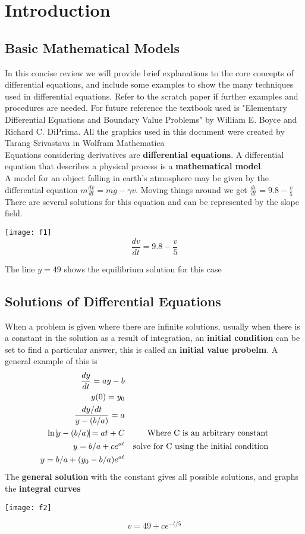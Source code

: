 \chapter{Introduction}
\section{Basic Mathematical Models}
In this concise review we will provide brief explanations to the core concepts of differential equations, and include some examples to show the many techniques used in differential equations. Refer to the scratch paper if further examples and procedures are needed. For future reference the textbook used is "Elementary Differential Equations and Boundary Value Problems" by William E. Boyce and Richard C. DiPrima. All the graphics used in this document were created by Tarang Srivastava in Wolfram Mathematica \\

Equations considering derivatives are \textbf{differential equations}. A differential equation that describes a physical process is a \textbf{mathematical model}. \\
A model for an object falling in earth's atmosphere may be given by the differential equation $m \frac{dv}{dt} = mg - \gamma v$. Moving things around we get $\frac{dv}{dt} = 9.8 - \frac{v}{5}$ There are several solutions for this equation and can be represented by the slope field. \\
\begin{center}
	\texttt{[image: f1]}
	$$\frac{dv}{dt} = 9.8 - \frac{v}{5}$$
\end{center}
The line $y=49$ shows the equilibrium solution for this case\\
\section{Solutions of Differential Equations}
When a problem is given where there are infinite solutions, usually when there is a constant in the solution as a result of integration, an \textbf{initial condition} can be set to find a particular answer, this is called an \textbf{initial value probelm}. A general example of this is
\begin{align*}
\dfrac{dy}{dt} = ay - b \\
y(0) = y_0 \\
\frac{dy/dt}{y-(b/a)} = a\\
\ln{ \vline y-(b/a) \vline} = at + C && \text{Where C is an arbitrary constant}\\ 
y = b/a + ce^{at} && \text{solve for C using the initial condition}\\
y = b/a + (y_0 - b/a)e^{at}
\end{align*}
The \textbf{general solution} with the constant gives all possible solutions, and graphs the \textbf{integral curves} 
\begin{center}
	\texttt{[image: f2]}
\end{center}
$$v = 49 + ce^{-t/5}$$

